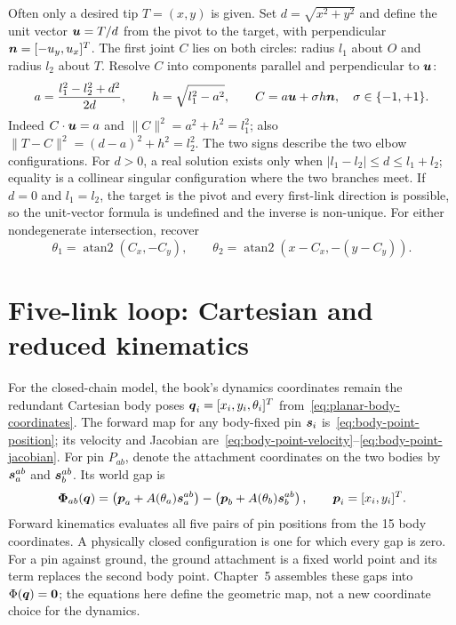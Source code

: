 \documentclass[../main.tex]{subfiles}
\begin{document}
Often only a desired tip $T=(x,y)$ is given. Set $d=\sqrt{x^2+y^2}$ and define the unit vector $\boldsymbol{u}=T/d$ from the pivot to the target, with perpendicular $\boldsymbol{n}=[-u_y,u_x]^T$. The first joint $C$ lies on both circles: radius $l_1$ about $O$ and radius $l_2$ about $T$. Resolve $C$ into components parallel and perpendicular to $\boldsymbol{u}$:
\begin{equation}
a=\frac{l_1^2-l_2^2+d^2}{2d},
\qquad
h=\sqrt{l_1^2-a^2},
\qquad
C=a\boldsymbol{u}+\sigma h\boldsymbol{n},\quad \sigma\in\{-1,+1\}.
\label{eq:double-pendulum-inverse-circle-intersection}
\end{equation}
Indeed $C\cdot\boldsymbol{u}=a$ and $\|C\|^2=a^2+h^2=l_1^2$; also $\|T-C\|^2=(d-a)^2+h^2=l_2^2$. The two signs describe the two elbow configurations. For $d>0$, a real solution exists only when $|l_1-l_2|\le d\le l_1+l_2$; equality is a collinear singular configuration where the two branches meet. If $d=0$ and $l_1=l_2$, the target is the pivot and every first-link direction is possible, so the unit-vector formula is undefined and the inverse is non-unique. For either nondegenerate intersection, recover
\begin{equation}
\theta_1=\operatorname{atan2}(C_x,-C_y),
\qquad
\theta_2=\operatorname{atan2}(x-C_x,-(y-C_y)).
\label{eq:double-pendulum-inverse-angles}
\end{equation}

\section{Five-link loop: Cartesian and reduced kinematics}

For the closed-chain model, the book's dynamics coordinates remain the redundant Cartesian body poses $\boldsymbol{q}_i=[x_i,y_i,\theta_i]^T$ from~\eqref{eq:planar-body-coordinates}. The forward map for any body-fixed pin $\boldsymbol{s}_i$ is~\eqref{eq:body-point-position}; its velocity and Jacobian are~\eqref{eq:body-point-velocity}--\eqref{eq:body-point-jacobian}. For pin $P_{ab}$, denote the attachment coordinates on the two bodies by $\boldsymbol{s}_a^{ab}$ and $\boldsymbol{s}_b^{ab}$. Its world gap is
\begin{equation}
\boldsymbol{\Phi}_{ab}(\boldsymbol{q})=
\left(\boldsymbol{p}_a+A(\theta_a)\boldsymbol{s}_a^{ab}\right)
-\left(\boldsymbol{p}_b+A(\theta_b)\boldsymbol{s}_b^{ab}\right),
\qquad \boldsymbol{p}_i=[x_i,y_i]^T.
\label{eq:five-link-forward-pin-gap}
\end{equation}
Forward kinematics evaluates all five pairs of pin positions from the 15 body coordinates. A physically closed configuration is one for which every gap is zero. For a pin against ground, the ground attachment is a fixed world point and its term replaces the second body point. Chapter~5 assembles these gaps into $\Phi(\boldsymbol{q})=\boldsymbol{0}$; the equations here define the geometric map, not a new coordinate choice for the dynamics.
\end{document}
